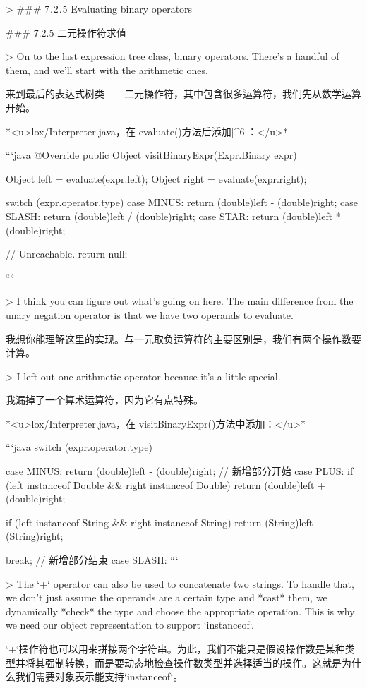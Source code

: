 \documentclass[cn,11pt,chinese]{elegantbook}
\begin{document}
{{> ### 7 . 2 . 5 Evaluating binary operators

### 7.2.5 二元操作符求值

> On to the last expression tree class, binary operators. There’s a handful of them, and we’ll start with the arithmetic ones.

来到最后的表达式树类——二元操作符，其中包含很多运算符，我们先从数学运算开始。

*<u>lox/Interpreter.java，在 evaluate()方法后添加[^6]：</u>*

```java
  @Override
  public Object visitBinaryExpr(Expr.Binary expr) {
    Object left = evaluate(expr.left);
    Object right = evaluate(expr.right); 

    switch (expr.operator.type) {
      case MINUS:
        return (double)left - (double)right;
      case SLASH:
        return (double)left / (double)right;
      case STAR:
        return (double)left * (double)right;
    }

    // Unreachable.
    return null;
  }
```

> I think you can figure out what’s going on here. The main difference from the unary negation operator is that we have two operands to evaluate.

我想你能理解这里的实现。与一元取负运算符的主要区别是，我们有两个操作数要计算。

> I left out one arithmetic operator because it’s a little special.

我漏掉了一个算术运算符，因为它有点特殊。

*<u>lox/Interpreter.java，在 visitBinaryExpr()方法中添加：</u>*

```java
    switch (expr.operator.type) {
      case MINUS:
        return (double)left - (double)right;
      // 新增部分开始
      case PLUS:
        if (left instanceof Double && right instanceof Double) {
          return (double)left + (double)right;
        } 

        if (left instanceof String && right instanceof String) {
          return (String)left + (String)right;
        }

        break;
      // 新增部分结束
      case SLASH:
```

> The `+` operator can also be used to concatenate two strings. To handle that, we don’t just assume the operands are a certain type and *cast* them, we dynamically *check* the type and choose the appropriate operation. This is why we need our object representation to support `instanceof`.

`+`操作符也可以用来拼接两个字符串。为此，我们不能只是假设操作数是某种类型并将其强制转换，而是要动态地检查操作数类型并选择适当的操作。这就是为什么我们需要对象表示能支持`instanceof`。

}}}
\end{document}
